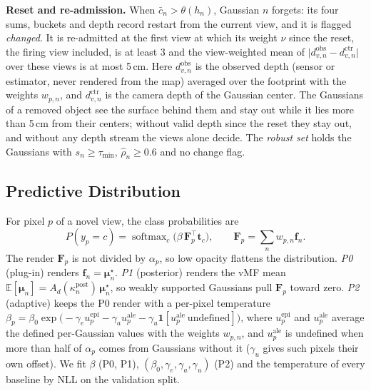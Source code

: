 \documentclass[journal]{IEEEtran}
\newcommand{\muv}{\boldsymbol{\mu}}
\begin{document}
\textbf{Reset and re-admission.} When $\bar c_n>\theta(h_n)$, Gaussian $n$ forgets: its four sums, buckets and depth record restart from the current view, and it is flagged \emph{changed}. It is re-admitted at the first view at which its weight $\nu$ since the reset, the firing view included, is at least 3 and the view-weighted mean of $\lvert d^{\mathrm{obs}}_{v,n}-d^{\mathrm{ctr}}_{v,n}\rvert$ over these views is at most 5\,cm. Here $d^{\mathrm{obs}}_{v,n}$ is the observed depth (sensor or estimator, never rendered from the map) averaged over the footprint with the weights $w_{p,n}$, and $d^{\mathrm{ctr}}_{v,n}$ is the camera depth of the Gaussian center. The Gaussians of a removed object see the surface behind them and stay out while it lies more than 5\,cm from their centers; without valid depth since the reset they stay out, and without any depth stream the views alone decide. The \emph{robust set} holds the Gaussians with $s_n\ge\tau_{\min}$, $\hat\rho_n\ge0.6$ and no change flag.
\subsection{Predictive Distribution}
\label{sec:predictive}
For pixel $p$ of a novel view, the class probabilities are
\[
P(y_p=c)=\operatorname{softmax}_c\big(\beta\,\mathbf{F}_p^\top\mathbf{t}_c\big),
\qquad \mathbf{F}_p=\textstyle\sum_n w_{p,n}\mathbf{f}_n .
\]
The render $\mathbf{F}_p$ is not divided by $\alpha_p$, so low opacity flattens the distribution. \emph{P0} (plug-in) renders $\mathbf{f}_n=\muv^\star_n$. \emph{P1} (posterior) renders the vMF mean $\mathbb{E}[\muv_n]=A_d(\kappa^{\mathrm{post}}_n)\,\muv^\star_n$, so weakly supported Gaussians pull $\mathbf{F}_p$ toward zero. \emph{P2} (adaptive) keeps the P0 render with a per-pixel temperature $\beta_p=\beta_0\exp\!\big(-\gamma_e u^{\mathrm{epi}}_p-\gamma_a u^{\mathrm{ale}}_p -\gamma_u\mathbf{1}[u^{\mathrm{ale}}_p\ \text{undefined}]\big)$, where $u^{\mathrm{epi}}_p$ and $u^{\mathrm{ale}}_p$ average the defined per-Gaussian values with the weights $w_{p,n}$, and $u^{\mathrm{ale}}_p$ is undefined when more than half of $\alpha_p$ comes from Gaussians without it ($\gamma_u$ gives such pixels their own offset). We fit $\beta$ (P0, P1), $(\beta_0,\gamma_e,\gamma_a,\gamma_u)$ (P2) and the temperature of every baseline by NLL on the validation split.
\end{document}
